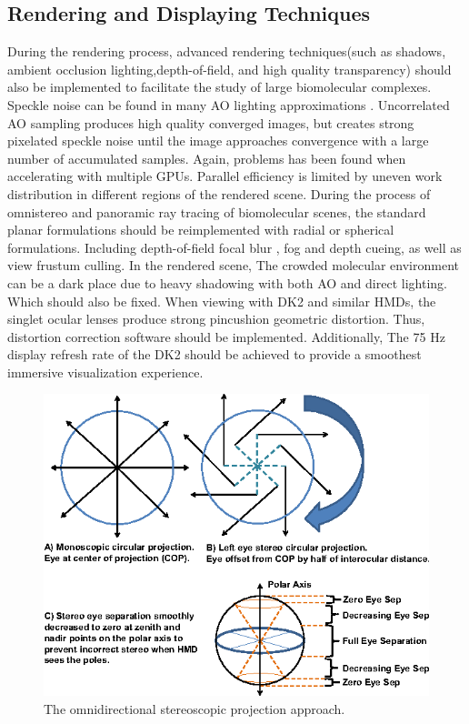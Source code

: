 \documentclass[10pt,twocolumn,letterpaper]{article}
\begin{document}
\subsection{Rendering and Displaying Techniques}

During the rendering process, advanced rendering techniques(such as shadows, ambient occlusion lighting,depth-of-field, and high quality transparency) should also be implemented to facilitate the study of large biomolecular complexes. Speckle noise can be found in many AO lighting approximations \cite{Saadia:2018}. Uncorrelated AO sampling produces high quality converged images, but creates strong pixelated speckle noise until the image approaches convergence with a large number of accumulated samples. Again, problems has been found when accelerating with multiple GPUs. Parallel efficiency is limited by uneven work distribution in different regions of the rendered scene. During the process of omnistereo and panoramic ray tracing of biomolecular scenes, the standard planar formulations should be reimplemented with radial or spherical formulations. Including depth-of-field focal blur \cite{Kosara2004SemanticDO}, fog and depth cueing, as well as view frustum culling. In the rendered scene, The crowded molecular environment can be a dark place due to heavy shadowing with both AO and direct lighting. Which should also be fixed. When viewing with DK2 and similar HMDs, the singlet ocular lenses produce strong pincushion geometric distortion. Thus, distortion correction software should be implemented. Additionally, The 75 Hz display refresh rate of the DK2 should be achieved to provide a smoothest immersive visualization experience.

\begin{figure}[h]
\begin{center}
   \includegraphics[width=1.0\linewidth]{projection-approach.png}
\end{center}
   \caption{The omnidirectional stereoscopic projection approach.}
\label{fig:projection-approach}
\end{figure}
\end{document}
